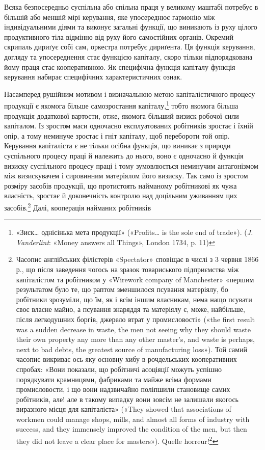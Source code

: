 Всяка безпосередньо суспільна або спільна праця у великому
маштабі потребує в більшій або меншій мірі керування, яке упосереднює
гармонію між індивідуальними діями та виконує загальні
функції, що виникають із руху цілого продуктивного тіла
відмінно від руху його самостійних органів. Окремий скрипаль
дириґує собі сам, оркестра потребує дириґента. Ця функція
керування, догляду та упосереднення стає функцією капіталу,
скоро тільки підпорядкована йому праця стає кооперативною.
Як специфічна функція капіталу функція керування набирає
специфічних характеристичних ознак.

Насамперед рушійним мотивом і визначальною метою капіталістичного
процесу продукції є якомога більше самозростання
капіталу,\footnote{
«Зиск\dots{} однісінька мета продукції» («Profits\dots{} is the sole end
of trade»). (\emph{J. Vanderlint}: «Money answers all Things», London 1734,
p. 11)
} тобто якомога більша продукція додаткової вартости,
отже, якомога більший визиск робочої сили капіталом. Із зростом
маси одночасно експлуатованих робітників зростає і їхній
опір, а тому неминуче зростає і гніт капіталу, щоб перебороти
той опір. Керування капіталіста є не тільки осібна функція, що
виникає з природи суспільного процесу праці й належить до нього,
воно є одночасно й функція визиску суспільного процесу праці
і тому зумовлюється неминучим антагонізмом між визискувачем
і сировинним матеріялом його визиску. Так само із зростом розміру
засобів продукції, що протистоять найманому робітникові
як чужа власність, зростає й доконечність контролю над доцільним
уживанням цих засобів.\footnote{
Часопис англійських філістерів «Spectator» сповіщає в числі
з 3 червня 1866 р., що після заведення чогось на зразок товариського підприємства
між капіталістом та робітником у «Wirework company of Manchester»
«першим результатом було те, що раптом зменшилося псування
матеріялу, бо робітники зрозуміли, що їм, як і всім іншим власникам,
нема нащо псувати своє власне майно, а псування знаряддя та матеріялу
є, може, найбільше, після легкодушних боргів, джерело втрат у промисловості»
(«the first result was a sudden decrease in waste, the men not seeing
why they should waste their own property any more than any other master’s,
and waste is perhaps, next to bad debts, the greatest source of manufacturing
loss»). Той самий часопис викриває ось яку основну хибу в рочдельських кооперативних
спробах: «Вони показали, що робітничі асоціяції можуть
успішно порядкувати крамницями, фабриками та майже всіма формами
промисловости, і що вони надзвичайно поліпшили становище самих робітників,
але! але в такому випадку вони зовсім не залишали якогось виразного
місця для капіталіста» («They showed that associations of workmen
could manage shops, mills, and almost all forms of industry with success,
and they immensely improved the condition of the men, but then they did
not leave a clear place for masters»). Quelle horreur!\footnote*{
Який жах! \emph{Ред.}
}
} Далі, кооперація найманих робітників
